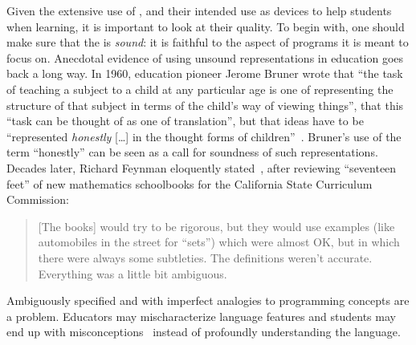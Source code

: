 Given the extensive use of \nms{},
and
their intended use as devices to help students when learning,
it is important to look at their quality.
To begin with,
one should
make sure that the \nm{} is \emph{sound}:
it is
faithful to the aspect of programs it is meant to focus on.
%
Anecdotal evidence of using unsound representations in education goes back a long way.
%
In 1960, education pioneer Jerome Bruner wrote that
``the task of teaching a subject to a child at any particular age is one of representing the structure of that subject in terms of the child’s way of viewing things'', that this
``task can be thought of as one of translation'', but that ideas have to be
``represented \emph{honestly} […] in the thought forms of children''~\cite{ brunerProcessEducation1960}.
Bruner’s use of the term ``honestly'' can be seen as a call for soundness of such representations.
%
Decades later,
Richard Feynman eloquently stated~\citep{feynmanSurelyYouRe1985},
after reviewing ``seventeen feet'' of new mathematics schoolbooks for the California State Curriculum Commission:

\begin{quote}
    [The books] would try to be rigorous, but they would use examples
    (like automobiles in the street for ``sets'')
    which were almost OK, but in which there were always some subtleties.
    The definitions weren't accurate.
    Everything was a little bit ambiguous.
\end{quote}

Ambiguously specified \nms{}
and
\nms{} with imperfect analogies to programming concepts
are a problem.
Educators may mischaracterize language features and
students may end up with misconceptions~\citep{chiodiniCuratedInventoryProgramming2021} instead of profoundly understanding the language.

